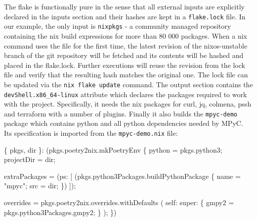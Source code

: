 \documentclass[
]{article}
\newenvironment{Shaded}{}{}
\newcommand{\NormalTok}[1]{#1}
\newcommand{\OperatorTok}[1]{\textcolor[rgb]{0.40,0.40,0.40}{#1}}
\newcommand{\StringTok}[1]{\textcolor[rgb]{0.25,0.44,0.63}{#1}}
\newcommand{\VariableTok}[1]{\textcolor[rgb]{0.10,0.09,0.49}{#1}}
\begin{document}
The flake is functionally pure in the sense that all external inputs are
explicitly declared in the inputs section and their hashes are kept in a
\texttt{flake.lock} file. In our example, the only input is
\texttt{nixpkgs} - a community managed repository containing the nix
build expressions for more than 80 000 packages. When a nix command uses
the file for the first time, the latest revision of the nixos-unstable
branch of the git repository will be fetched and its contents will be
hashed and placed in the flake.lock. Further executions will reuse the
revision from the lock file and verify that the resulting hash matches
the original one. The lock file can be updated via the
\texttt{nix\ flake\ update} command. The output section contains the
\texttt{devShell.x86\_64-linux} attribute which declares the packages
required to work with the project. Specifically, it needs the nix
packages for curl, jq, colmena, pssh and terraform with a number of
plugins. Finally it also builds the \texttt{mpyc-demo} package which
contains python and all python dependencies needed by MPyC. Its
specification is imported from the \texttt{mpyc-demo.nix} file:

\begin{Shaded}
  \begin{Highlighting}[]
    \OperatorTok{\{} \VariableTok{pkgs}\OperatorTok{,} \VariableTok{dir} \OperatorTok{\}}\NormalTok{:}
    \OperatorTok{(}\NormalTok{pkgs.poetry2nix.mkPoetryEnv }\OperatorTok{\{}
    \VariableTok{python} \OperatorTok{=}\NormalTok{ pkgs.python3}\OperatorTok{;}
    \VariableTok{projectDir} \OperatorTok{=}\NormalTok{ dir}\OperatorTok{;}

    \VariableTok{extraPackages} \OperatorTok{=} \OperatorTok{(}\VariableTok{ps}\OperatorTok{:} \OperatorTok{[}
    \OperatorTok{(}\NormalTok{pkgs.python3Packages.buildPythonPackage}
    \OperatorTok{\{}
    \VariableTok{name} \OperatorTok{=} \StringTok{"mpyc"}\OperatorTok{;}
    \VariableTok{src} \OperatorTok{=}\NormalTok{ dir}\OperatorTok{;}
    \OperatorTok{\})}
    \OperatorTok{]);}

    \VariableTok{overrides} \OperatorTok{=}\NormalTok{ pkgs.poetry2nix.overrides.withDefaults }\OperatorTok{(}
    \VariableTok{self}\OperatorTok{:} \VariableTok{super}\OperatorTok{:} \OperatorTok{\{}
    \VariableTok{gmpy2} \OperatorTok{=}\NormalTok{ pkgs.python3Packages.gmpy2}\OperatorTok{;}
    \OperatorTok{\}}
    \OperatorTok{);}
    \OperatorTok{\})}
  \end{Highlighting}
\end{Shaded}
\end{document}
